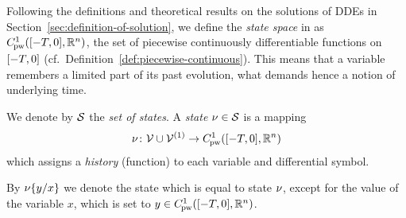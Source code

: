     Following the definitions and theoretical results on the solutions of  DDEs in Section~\ref{sec:definition-of-solution}, we define the \emph{state space} in \ddL as $\statespace$, the set of piecewise continuously differentiable functions on $\closeddelayinterval$ (cf.\ Definition~\ref{def:piecewise-continuous}).
    This means that a variable remembers a limited part of its past evolution, what demands hence a notion of underlying time.

    We denote by $\states$ the \emph{set of states}. A \emph{state} $\asstate\in\states$ is a mapping
    \begin{equation}
        \asstate \from \allvars\cup\diffvars \to \statespace
    \end{equation}
    which assigns a \emph{history} (function) to each variable and differential symbol.

    By $\modif{\asstate}{x}{y}$ we denote the state which is equal to state $\asstate$, except for the value of the variable $x$, which is set to $y\in\statespace$.


    

